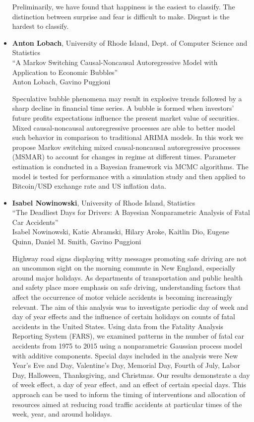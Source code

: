 \begin{itemize}
Preliminarily, we have found that happiness is the easiest to classify.  The distinction between surprise and fear is difficult to make.  Disgust is the hardest to classify.

\item \textbf{Anton Lobach}, University of Rhode Island, Dept. of Computer Science and Statistics \\
``A Markov Switching Causal-Noncausal Autoregressive Model with Application to Economic Bubbles'' \\
Anton Lobach, Gavino Puggioni


Speculative bubble phenomena may result in explosive trends followed by
a sharp decline in financial time series. A bubble is formed when investors’
future profits expectations influence the present market value of securities.
Mixed causal-noncausal autoregressive processes are able to better model
such behavior in comparison to traditional ARIMA models. In this work we
propose Markov switching mixed causal-noncausal autoregressive processes
(MSMAR) to account for changes in regime at different times. Parameter
estimation is conducted in a Bayesian framework via MCMC algorithms. The
model is tested for performance with a simulation study and then applied to
Bitcoin/USD exchange rate and US inflation data.

\item \textbf{Isabel Nowinowski}, University of Rhode Island, Statistics \\
``The Deadliest Days for Drivers: A Bayesian Nonparametric Analysis of Fatal Car Accidents'' \\
Isabel Nowinowski, Katie Abramski, Hilary Aroke, Kaitlin Dio,  Eugene Quinn, Daniel M. Smith, Gavino Puggioni


Highway road signs displaying witty messages promoting safe driving are not an uncommon sight on the morning commute in New England, especially around major holidays. As departments of transportation and public health and safety place more emphasis on safe driving, understanding factors that affect the occurrence of motor vehicle accidents is becoming increasingly relevant. The aim of this analysis was to investigate periodic day of week and day of year effects and the influence of certain holidays on counts of fatal accidents in the United States. Using data from the Fatality Analysis Reporting System (FARS), we examined patterns in the number of fatal car accidents from 1975 to 2015 using a nonparametric Gaussian process model with additive components. Special days included in the analysis were New Year’s Eve and Day, Valentine’s Day, Memorial Day, Fourth of July, Labor Day, Halloween, Thanksgiving, and Christmas. Our results demonstrate a day of week effect, a day of year effect, and an effect of certain special days. This approach can be used to inform the timing of interventions and allocation of resources aimed at reducing road traffic accidents at particular times of the week, year, and around holidays.


\end{itemize}
